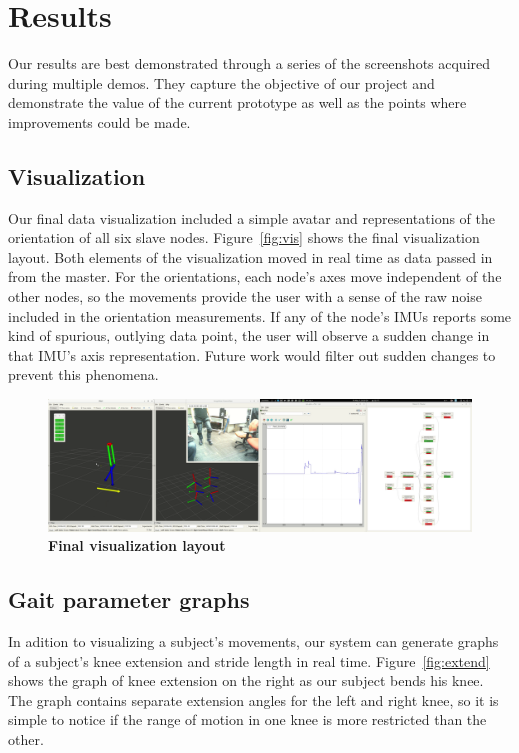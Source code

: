 \documentclass[conference]{IEEEtran}
\begin{document}
\section{Results}
Our results are best demonstrated through a series of the screenshots acquired during
multiple demos. They capture the objective of our project and demonstrate the value of the
current prototype as well as the points where improvements could be made. 
\subsection{Visualization}
Our final data visualization included a simple avatar and representations of the
orientation of all six slave nodes. Figure~\ref{fig:vis} shows the final visualization layout.
Both elements of the visualization moved in real time as data passed in from the master.
For the orientations, each node's axes move independent of the other nodes, so the
movements provide the user with a sense of the raw noise included in the orientation
measurements. If any of the node's IMUs reports some kind of spurious, outlying data
point, the user will observe a sudden change in that IMU's axis representation. Future
work would filter out sudden changes to prevent this phenomena. 

\begin{figure}[h]
  \centering
  \includegraphics[width=0.95\columnwidth]{figs/vis}
  \caption{{\bf Final visualization layout}}
  \label{fig:vis }
\end{figure}

\subsection{Gait parameter graphs}
In adition to visualizing a subject's movements, our system can generate graphs of a
subject's knee extension and stride length in real time. Figure~\ref{fig:extend} shows the
graph of knee extension on the right as our subject bends his knee. The graph contains
separate extension angles for the left and right knee, so it is simple to notice if the
range of motion in one knee is more restricted than the other. 
\end{document}
